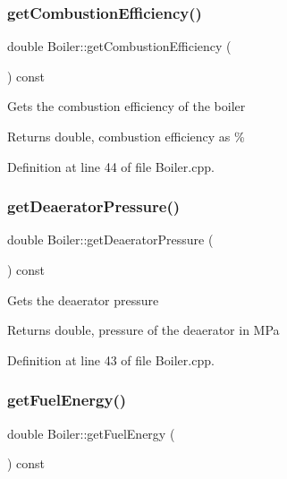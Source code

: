\subsubsection{\texorpdfstring{get\+Combustion\+Efficiency()}{getCombustionEfficiency()}}
{\footnotesize\ttfamily double Boiler\+::get\+Combustion\+Efficiency (\begin{DoxyParamCaption}{ }\end{DoxyParamCaption}) const}

Gets the combustion efficiency of the boiler \begin{DoxyReturn}{Returns}
double, combustion efficiency as \% 
\end{DoxyReturn}


Definition at line 44 of file Boiler.\+cpp.

\mbox{\label{class_boiler_aad4786e7b68084e65a35dd6235517b8c}} 
\subsubsection{\texorpdfstring{get\+Deaerator\+Pressure()}{getDeaeratorPressure()}}
{\footnotesize\ttfamily double Boiler\+::get\+Deaerator\+Pressure (\begin{DoxyParamCaption}{ }\end{DoxyParamCaption}) const}

Gets the deaerator pressure \begin{DoxyReturn}{Returns}
double, pressure of the deaerator in M\+Pa 
\end{DoxyReturn}


Definition at line 43 of file Boiler.\+cpp.

\mbox{\label{class_boiler_a55542a761669c842163b20932f9747d3}} 
\subsubsection{\texorpdfstring{get\+Fuel\+Energy()}{getFuelEnergy()}}
{\footnotesize\ttfamily double Boiler\+::get\+Fuel\+Energy (\begin{DoxyParamCaption}{ }\end{DoxyParamCaption}) const\hspace{0.3cm}{\ttfamily [inline]}}

